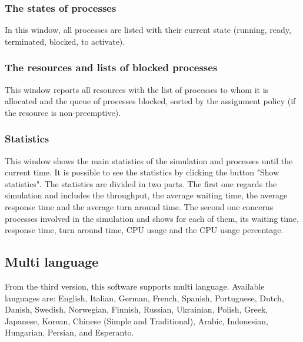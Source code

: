 \documentclass[10pt,a4paper,twoside,titlepage]{article}
\begin{document}
\subsubsection{The states of processes}
\label{subsubsec:The states of processes}
In this window, all processes are listed with their current state (running, ready, terminated, blocked, to activate).

\subsubsection{The resources and lists of blocked processes}
\label{subsubsec:The resources and lists of blocked processes}
This window reports all resources with the list of processes to whom it is allocated and the queue of processes blocked, sorted by the assignment policy (if the resource is non-preemptive).

\subsubsection{Statistics}
\label{subsubsec:statistics} 
This window shows the main statistics of the simulation and processes until the current time. It is possible to see the statistics by clicking the button "Show statistics". The statistics are divided in two parts. The first one regards the simulation and includes the throughput, the average waiting time, the average response time and the average turn around time. The second one concerns processes involved in the simulation and shows for each of them, its waiting time, response time, turn around time, CPU usage and the CPU usage percentage.




\subsection{Multi language}
\label{subsec:Multi language}
From the third version, this software supports multi language.
Available languages are: English, Italian, German, French, Spanish, Portuguese, Dutch, Danish, Swedish, Norwegian, Finnish, Russian, Ukrainian, Polish, Greek, Japanese, Korean, Chinese (Simple and Traditional), Arabic, Indonesian, Hungarian, Persian, and Esperanto.
\end{document}
